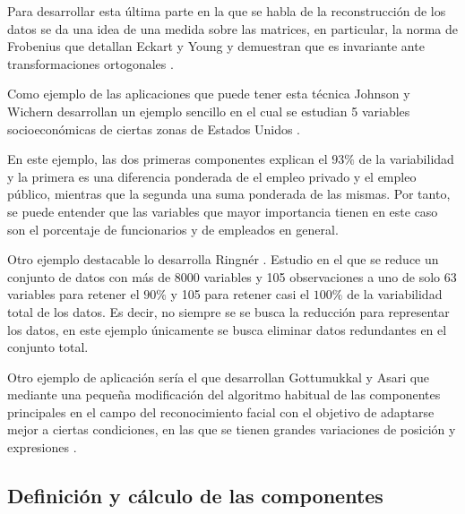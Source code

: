\noindent Para desarrollar esta última parte en la que se habla de la reconstrucción de los datos se da una idea de una medida sobre las matrices, en particular, la norma de Frobenius que detallan Eckart y Young y demuestran que es invariante ante transformaciones ortogonales \cite{Eckart 1936}.

\noindent Como ejemplo de las aplicaciones que puede tener esta técnica Johnson y Wichern  desarrollan un ejemplo sencillo en el cual se estudian 5 variables socioeconómicas de ciertas zonas de Estados Unidos \cite{Johnson 2007}.

\noindent En este ejemplo, las dos primeras componentes explican el $93\%$ de la variabilidad y la primera es una diferencia ponderada de el empleo privado y el empleo público, mientras que la segunda una suma ponderada de las mismas. Por tanto, se puede entender que las variables que mayor importancia tienen en este caso son el porcentaje de funcionarios y de empleados en general.

\noindent Otro ejemplo destacable lo desarrolla Ringnér \cite{Ringnér 2008}. Estudio en el que se reduce un conjunto de datos con más de 8000 variables y 105 observaciones a uno de solo 63 variables para retener el $90\%$ y 105 para retener casi el $100\%$ de la variabilidad total de los datos. Es decir, no siempre se se busca la reducción para representar los datos, en este ejemplo únicamente se busca eliminar datos redundantes en el conjunto total. 

\noindent Otro ejemplo de aplicación sería el que desarrollan Gottumukkal y Asari que mediante una pequeña modificación del algoritmo habitual de las componentes principales en el campo del reconocimiento facial con el objetivo de adaptarse mejor a ciertas condiciones, en las que se tienen grandes variaciones de posición y expresiones \cite {Asari 2004}.
\subsection{Definición y cálculo de las componentes}

